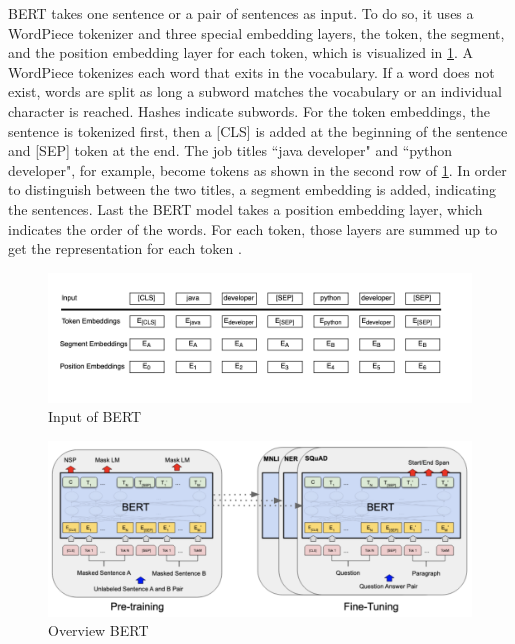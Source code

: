 \documentclass[12pt, a4paper, titlepage]{article}
\begin{document}
\ac{BERT} takes one sentence or a pair of sentences as input. To do so, it uses a WordPiece tokenizer and three special embedding layers, the token, the segment, and the position embedding layer for each token, which is visualized in \ref{fig: F4}. A WordPiece tokenizes each word that exits in the vocabulary. If a word does not exist, words are split as long a subword matches the vocabulary or an individual character is reached. Hashes indicate subwords. For the token embeddings, the sentence is tokenized first, then a [CLS] is added at the beginning of the sentence and [SEP] token at the end. The job titles ``java developer" and ``python developer", for example, become tokens as shown in the second row of \ref{fig: F4}. In order to distinguish between the two titles, a segment embedding is added, indicating the sentences. Last the \ac{BERT} model takes a position embedding layer, which indicates the order of the words. For each token, those layers are summed up to get the representation for each token \citep{devlin2018,ravichandiran2021}.

\begin{figure}[hb!]
  \center
  \includegraphics[scale=0.8]{BERTInput_own.png}
  \caption[Input of BERT]{\label{fig: F4} Input of BERT \citep[5]{devlin2018}}
\end{figure}

\begin{figure}[hb!]
  \center
  \includegraphics[scale=0.5]{BERTOverview.png}
  \caption[Overview BERT]{\label{fig: F3} Overview BERT \citep[3]{devlin2018}}
\end{figure}
\end{document}
